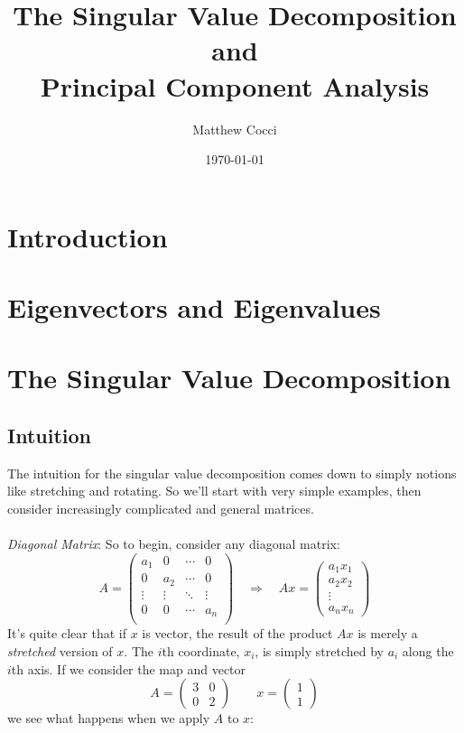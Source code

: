 \documentclass[12pt]{article}
\author{Matthew Cocci}
\title{The Singular Value Decomposition and \\
Principal Component Analysis}
\date{\today}
\begin{document}
\maketitle


\section{Introduction}
\section{Eigenvectors and Eigenvalues}
\section{The Singular Value Decomposition}

\subsection{Intuition}

The intuition for the singular value decomposition comes down to simply notions like stretching and rotating. So we'll start with very simple examples, then consider increasingly complicated and general matrices.
\\
\\
{\sl Diagonal Matrix}: So to begin, consider any diagonal matrix:
\[ 
    A = 
    \begin{pmatrix}
        a_1 & 0 & \cdots & 0 \\
        0 & a_2 & \cdots & 0 \\
        \vdots & \vdots & \ddots & \vdots \\
        0 & 0 & \cdots & a_n \\
    \end{pmatrix}
    \quad 
    \Rightarrow 
    \quad 
    Ax = \begin{pmatrix} a_1 x_1 \\ a_2 x_2 \\ \vdots \\
        a_n x_n \end{pmatrix}
\]
It's quite clear that if $x$ is vector, the result of the product $Ax$ is merely a \emph{stretched} version of $x$. The $i$th coordinate, $x_i$, is simply stretched by $a_i$ along the $i$th axis. If we consider the map and vector
\[
    A = \begin{pmatrix} 3 & 0 \\ 0 & 2 \end{pmatrix}
    \qquad x =\begin{pmatrix} 1 \\ 1  \end{pmatrix}
\]
we see what happens when we apply $A$ to $x$:
\end{document}
